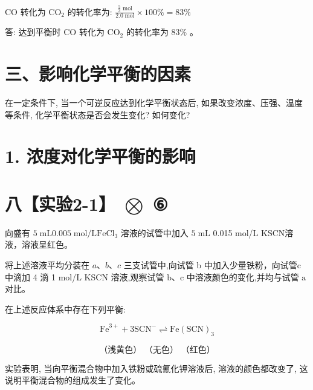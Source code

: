 \documentclass[10pt]{article}
\begin{document}
\(\mathrm{{CO}}\) 转化为 \({\mathrm{{CO}}}_{2}\) 的转化率为: \(\frac{\frac{5}{3}\mathrm{\;{mol}}}{{2.0}\mathrm{\;{mol}}} \times {100}\% = {83}\%\)

答: 达到平衡时 \(\mathrm{{CO}}\) 转化为 \({\mathrm{{CO}}}_{2}\) 的转化率为 \({83}\%\) 。

\section*{三、影响化学平衡的因素}

在一定条件下, 当一个可逆反应达到化学平衡状态后, 如果改变浓度、压强、温度等条件, 化学平衡状态是否会发生变化? 如何变化?

\section*{1. 浓度对化学平衡的影响}

\section*{八【实验2-1】 \(\bigotimes\) ⑥}

向盛有 \(5\mathrm{\;{mL}}{0.005}\mathrm{\;{mol}}/\mathrm{L}{\mathrm{{FeCl}}}_{3}\) 溶液的试管中加入 \(5\mathrm{\;{mL}}\) 0.015 mol/L KSCN溶液，溶液呈红色。

将上述溶液平均分装在 \(a\text{、}b\text{、}c\) 三支试管中,向试管 b 中加入少量铁粉，向试管c 中滴加 4 滴 1 mol/L KSCN 溶液,观察试管 \(\mathrm{b}\text{、}\mathrm{c}\) 中溶液颜色的变化,并均与试管 \(\mathrm{a}\) 对比。

\begin{center}
\end{center}

在上述反应体系中存在下列平衡:

\[
{\mathrm{{Fe}}}^{3 + } + 3{\mathrm{{SCN}}}^{ - } \rightleftharpoons \mathrm{{Fe}}{\left( \mathrm{{SCN}}\right) }_{3}
\]

\[
\text{（浅黄色） （无色） （红色）}
\]

实验表明, 当向平衡混合物中加入铁粉或硫氰化钾溶液后, 溶液的颜色都改变了, 这说明平衡混合物的组成发生了变化。
\end{document}
